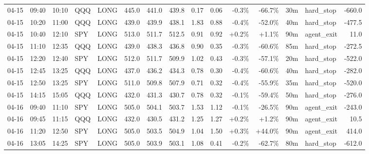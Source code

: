 \documentclass[11pt,a4paper,twoside]{article}
\begin{document}
\begin{landscape}
\begin{center}
\begin{longtable}{>{\color{txtmain}}l l l l l r r r r r r r r >{\color{txtmain}}l r}
04-15 & 09:40 & 10:10 & QQQ & LONG & 445.0 & 441.0 & 439.8 & 0.17 & 0.06 & \textcolor{lossred}{-0.3\%} & \textcolor{lossred}{-66.7\%} & 30m & hard\_stop & \textcolor{lossred}{-660.0} \\
04-15 & 10:20 & 11:00 & QQQ & LONG & 439.0 & 439.9 & 438.1 & 1.83 & 0.88 & \textcolor{lossred}{-0.4\%} & \textcolor{lossred}{-52.0\%} & 40m & hard\_stop & \textcolor{lossred}{-477.5} \\
04-15 & 10:40 & 12:10 & SPY & LONG & 513.0 & 511.7 & 512.5 & 0.91 & 0.92 & \textcolor{wingreen}{+0.2\%} & \textcolor{wingreen}{+1.1\%} & 90m & agent\_exit & \textcolor{wingreen}{11.0} \\
04-15 & 11:10 & 12:35 & QQQ & LONG & 439.0 & 438.3 & 436.8 & 0.90 & 0.35 & \textcolor{lossred}{-0.3\%} & \textcolor{lossred}{-60.6\%} & 85m & hard\_stop & \textcolor{lossred}{-272.5} \\
04-15 & 12:20 & 12:40 & SPY & LONG & 512.0 & 511.7 & 509.9 & 1.02 & 0.43 & \textcolor{lossred}{-0.3\%} & \textcolor{lossred}{-57.1\%} & 20m & hard\_stop & \textcolor{lossred}{-522.0} \\
04-15 & 12:45 & 13:25 & QQQ & LONG & 437.0 & 436.2 & 434.3 & 0.78 & 0.30 & \textcolor{lossred}{-0.4\%} & \textcolor{lossred}{-60.6\%} & 40m & hard\_stop & \textcolor{lossred}{-282.0} \\
04-15 & 12:50 & 13:25 & SPY & LONG & 511.0 & 509.8 & 507.9 & 0.71 & 0.32 & \textcolor{lossred}{-0.4\%} & \textcolor{lossred}{-55.9\%} & 35m & hard\_stop & \textcolor{lossred}{-520.0} \\
04-15 & 14:15 & 15:05 & QQQ & LONG & 432.0 & 431.3 & 430.7 & 0.78 & 0.32 & \textcolor{lossred}{-0.1\%} & \textcolor{lossred}{-59.4\%} & 50m & hard\_stop & \textcolor{lossred}{-276.0} \\
04-16 & 09:40 & 11:10 & SPY & LONG & 505.0 & 504.1 & 503.7 & 1.53 & 1.12 & \textcolor{lossred}{-0.1\%} & \textcolor{lossred}{-26.5\%} & 90m & agent\_exit & \textcolor{lossred}{-243.0} \\
04-16 & 09:45 & 11:15 & QQQ & LONG & 432.0 & 430.5 & 431.2 & 1.25 & 1.27 & \textcolor{wingreen}{+0.2\%} & \textcolor{wingreen}{+1.2\%} & 90m & agent\_exit & \textcolor{wingreen}{10.5} \\
04-16 & 11:20 & 12:50 & SPY & LONG & 505.0 & 503.5 & 504.9 & 1.04 & 1.50 & \textcolor{wingreen}{+0.3\%} & \textcolor{wingreen}{+44.0\%} & 90m & agent\_exit & \textcolor{wingreen}{414.0} \\
04-16 & 13:05 & 14:25 & SPY & LONG & 505.0 & 503.9 & 503.1 & 1.08 & 0.41 & \textcolor{lossred}{-0.2\%} & \textcolor{lossred}{-62.7\%} & 80m & hard\_stop & \textcolor{lossred}{-612.0} \\

\end{longtable}
\end{center}
\end{landscape}
\end{document}
